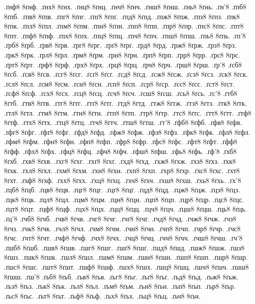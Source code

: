{.ґнф8 8ґнф.
.ґнх8 8ґнх.
.ґнц8 8ґнц.
.ґнч8 8ґнч.
.ґнш8 8ґнш.
.ґнь8 8ґнь.
.ґн'8
.ґпб8 8ґпб.
.ґпв8 8ґпв.
.ґпг8 8ґпг.
.ґпґ8 8ґпґ.
.ґпд8 8ґпд.
.ґпж8 8ґпж.
.ґпз8 8ґпз.
.ґпк8 8ґпк.
.ґпл8 8ґпл.
.ґпм8 8ґпм.
.ґпн8 8ґпн.
.ґпп8 8ґпп.
.ґпр8 8ґпр.
.ґпс8 8ґпс.
.ґпт8 8ґпт.
.ґпф8 8ґпф.
.ґпх8 8ґпх.
.ґпц8 8ґпц.
.ґпч8 8ґпч.
.ґпш8 8ґпш.
.ґпь8 8ґпь.
.ґп'8
.ґрб8 8ґрб.
.ґрв8 8ґрв.
.ґрг8 8ґрг.
.ґрґ8 8ґрґ.
.ґрд8 8ґрд.
.ґрж8 8ґрж.
.ґрз8 8ґрз.
.ґрк8 8ґрк.
.ґрл8 8ґрл.
.ґрм8 8ґрм.
.ґрн8 8ґрн.
.ґрп8 8ґрп.
.ґрр8 8ґрр.
.ґрс8 8ґрс.
.ґрт8 8ґрт.
.ґрф8 8ґрф.
.ґрх8 8ґрх.
.ґрц8 8ґрц.
.ґрч8 8ґрч.
.ґрш8 8ґрш.
.ґр'8
.ґсб8 8ґсб.
.ґсв8 8ґсв.
.ґсг8 8ґсг.
.ґсґ8 8ґсґ.
.ґсд8 8ґсд.
.ґсж8 8ґсж.
.ґсз8 8ґсз.
.ґск8 8ґск.
.ґсл8 8ґсл.
.ґсм8 8ґсм.
.ґсн8 8ґсн.
.ґсп8 8ґсп.
.ґср8 8ґср.
.ґсс8 8ґсс.
.ґст8 8ґст.
.ґсф8 8ґсф.
.ґсх8 8ґсх.
.ґсц8 8ґсц.
.ґсч8 8ґсч.
.ґсш8 8ґсш.
.ґсь8 8ґсь.
.ґс'8
.ґтб8 8ґтб.
.ґтв8 8ґтв.
.ґтг8 8ґтг.
.ґтґ8 8ґтґ.
.ґтд8 8ґтд.
.ґтж8 8ґтж.
.ґтз8 8ґтз.
.ґтк8 8ґтк.
.ґтл8 8ґтл.
.ґтм8 8ґтм.
.ґтн8 8ґтн.
.ґтп8 8ґтп.
.ґтр8 8ґтр.
.ґтс8 8ґтс.
.ґтт8 8ґтт.
.ґтф8 8ґтф.
.ґтх8 8ґтх.
.ґтц8 8ґтц.
.ґтч8 8ґтч.
.ґтш8 8ґтш.
.ґт'8
.ґфб8 8ґфб.
.ґфв8 8ґфв.
.ґфг8 8ґфг.
.ґфґ8 8ґфґ.
.ґфд8 8ґфд.
.ґфж8 8ґфж.
.ґфз8 8ґфз.
.ґфк8 8ґфк.
.ґфл8 8ґфл.
.ґфм8 8ґфм.
.ґфн8 8ґфн.
.ґфп8 8ґфп.
.ґфр8 8ґфр.
.ґфс8 8ґфс.
.ґфт8 8ґфт.
.ґфф8 8ґфф.
.ґфх8 8ґфх.
.ґфц8 8ґфц.
.ґфч8 8ґфч.
.ґфш8 8ґфш.
.ґфь8 8ґфь.
.ґф'8
.ґхб8 8ґхб.
.ґхв8 8ґхв.
.ґхг8 8ґхг.
.ґхґ8 8ґхґ.
.ґхд8 8ґхд.
.ґхж8 8ґхж.
.ґхз8 8ґхз.
.ґхк8 8ґхк.
.ґхл8 8ґхл.
.ґхм8 8ґхм.
.ґхн8 8ґхн.
.ґхп8 8ґхп.
.ґхр8 8ґхр.
.ґхс8 8ґхс.
.ґхт8 8ґхт.
.ґхф8 8ґхф.
.ґхх8 8ґхх.
.ґхц8 8ґхц.
.ґхч8 8ґхч.
.ґхш8 8ґхш.
.ґхь8 8ґхь.
.ґх'8
.ґцб8 8ґцб.
.ґцв8 8ґцв.
.ґцг8 8ґцг.
.ґцґ8 8ґцґ.
.ґцд8 8ґцд.
.ґцж8 8ґцж.
.ґцз8 8ґцз.
.ґцк8 8ґцк.
.ґцл8 8ґцл.
.ґцм8 8ґцм.
.ґцн8 8ґцн.
.ґцп8 8ґцп.
.ґцр8 8ґцр.
.ґцс8 8ґцс.
.ґцт8 8ґцт.
.ґцф8 8ґцф.
.ґцх8 8ґцх.
.ґцц8 8ґцц.
.ґцч8 8ґцч.
.ґцш8 8ґцш.
.ґць8 8ґць.
.ґц'8
.ґчб8 8ґчб.
.ґчв8 8ґчв.
.ґчг8 8ґчг.
.ґчґ8 8ґчґ.
.ґчд8 8ґчд.
.ґчж8 8ґчж.
.ґчз8 8ґчз.
.ґчк8 8ґчк.
.ґчл8 8ґчл.
.ґчм8 8ґчм.
.ґчн8 8ґчн.
.ґчп8 8ґчп.
.ґчр8 8ґчр.
.ґчс8 8ґчс.
.ґчт8 8ґчт.
.ґчф8 8ґчф.
.ґчх8 8ґчх.
.ґчц8 8ґчц.
.ґчч8 8ґчч.
.ґчш8 8ґчш.
.ґч'8
.ґшб8 8ґшб.
.ґшв8 8ґшв.
.ґшг8 8ґшг.
.ґшґ8 8ґшґ.
.ґшд8 8ґшд.
.ґшж8 8ґшж.
.ґшз8 8ґшз.
.ґшк8 8ґшк.
.ґшл8 8ґшл.
.ґшм8 8ґшм.
.ґшн8 8ґшн.
.ґшп8 8ґшп.
.ґшр8 8ґшр.
.ґшс8 8ґшс.
.ґшт8 8ґшт.
.ґшф8 8ґшф.
.ґшх8 8ґшх.
.ґшц8 8ґшц.
.ґшч8 8ґшч.
.ґшш8 8ґшш.
.ґш'8
.ґьб8 8ґьб.
.ґьв8 8ґьв.
.ґьг8 8ґьг.
.ґьґ8 8ґьґ.
.ґьд8 8ґьд.
.ґьж8 8ґьж.
.ґьз8 8ґьз.
.ґьк8 8ґьк.
.ґьл8 8ґьл.
.ґьм8 8ґьм.
.ґьн8 8ґьн.
.ґьп8 8ґьп.
.ґьр8 8ґьр.
.ґьс8 8ґьс.
.ґьт8 8ґьт.
.ґьф8 8ґьф.
.ґьх8 8ґьх.
.ґьц8 8ґьц.
.ґьч8 8ґьч.
}
